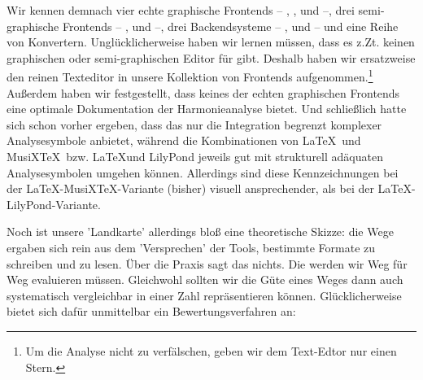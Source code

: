 Wir kennen demnach vier echte graphische Frontends -- ,
,  und  --, drei semi-graphische
Frontends -- ,  und  --,  drei
Backendsysteme -- ,  und
 -- und eine Reihe von Konvertern. Unglücklicherweise
haben wir lernen müssen, dass es z.Zt. keinen graphischen oder semi-graphischen
Editor für  gibt. Deshalb haben wir ersatzweise den reinen
Texteditor in unsere Kollektion von Frontends aufgenommen.\footnote{Um die
Analyse nicht zu verfälschen, geben wir dem Text-Edtor nur einen Stern.}
Außerdem haben wir festgestellt, dass keines der echten graphischen Frontends
eine optimale Dokumentation der Harmonieanalyse bietet. Und schließlich hatte
sich schon vorher ergeben, dass das  nur die Integration
begrenzt komplexer Analysesymbole anbietet, während die Kombinationen von
\LaTeX\ und MusiX\TeX\ bzw. \LaTeX und LilyPond jeweils gut mit strukturell
adäquaten Analysesymbolen umgehen können. Allerdings sind diese Kennzeichnungen
bei der \LaTeX-MusiX\TeX-Variante (bisher) visuell ansprechender, als bei der
\LaTeX-LilyPond-Variante.

Noch ist unsere 'Landkarte' allerdings bloß eine theoretische Skizze: die Wege
ergaben sich rein aus dem 'Versprechen' der Tools, bestimmte Formate zu
schreiben und zu lesen. Über die Praxis sagt das nichts. Die werden wir Weg für
Weg evaluieren müssen. Gleichwohl sollten wir die Güte eines Weges dann auch
systematisch vergleichbar in einer Zahl repräsentieren können. Glücklicherweise
bietet sich dafür unmittelbar ein Bewertungsverfahren an:

